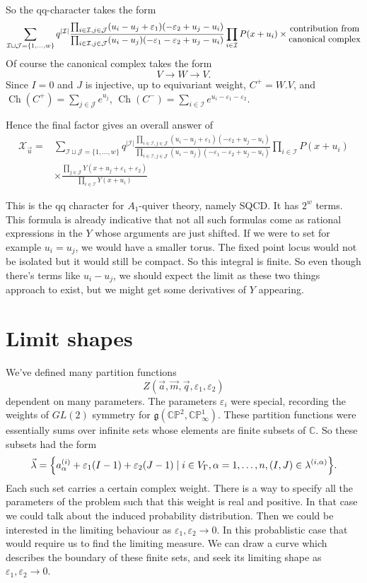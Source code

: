 \documentclass[leqno, openany]{memoir}
\theoremstyle{definition}
\theoremstyle{remark}
\theoremstyle{plain}
\theoremstyle{definition}
\theoremstyle{remark}
\newcommand{\ep}{\varepsilon}
\newcommand{\on}[1]{\operatorname{#1}}
\begin{document}
So the qq-character takes the form 
\[
\sum_{\mathcal{I} \sqcup \mathcal{J} = \{1,\dots,w\}} q^{|\mathcal{I}|} \frac{\prod_{i \in \mathcal{I},j \in \mathcal{J}}(u_i - u_j  + \ep_1)(-\ep_2 + u_j - u_i)}{\prod_{i \in \mathcal{I},j \in \mathcal{J}}(u_i - u_j)(-\ep_1 - \ep_2 + u_j - u_i)} \prod_{i \in \mathcal{I}} P(x + u_i) \times \Centerstack{{contribution from} {canonical complex}}
\]
Of course the canonical complex takes the form 
\[
V \to W \to V.
\]
Since $I = 0$ and $J$ is injective, up to equivariant weight,
$C^+ = W.V$, and $\on{Ch}(C^+) = \sum_{j \in \mathcal{J}} e^{u_j}$, $\on{Ch}(C^-) = \sum_{i \in \mathcal{I}} e^{u_i - \ep_1 - \ep_2}$.

Hence the final factor gives an overall answer of 
\begin{align*}
    \mathcal{X}_{\vec{u}} =&{} \sum_{\mathcal{I} \sqcup \mathcal{J} = \{1,\dots,w\}} q^{|\mathcal{I}|} \frac{\prod_{i \in \mathcal{I},j \in \mathcal{J}}(u_i - u_j  + \ep_1)(-\ep_2 + u_j - u_i)}{\prod_{i \in \mathcal{I},j \in \mathcal{J}}(u_i - u_j)(-\ep_1 - \ep_2 + u_j - u_i)} \prod_{i \in \mathcal{I}} P(x + u_i) \\ &\times \frac{\prod_{j \in \mathcal{J}} Y(x + u_j + \ep_1 + \ep_2)}{\prod_{i \in \mathcal{I}} Y(x + u_i)}
\end{align*}

This is the qq character for $A_1$-quiver theory, namely SQCD. It has $2^w$ terms. This formula is already indicative that not all such formulas come as rational expressions in the $Y$ whose arguments are just shifted.
If we were to set for example $u_i = u_j$, we would have a smaller torus. The fixed point locus would not be isolated but it would still be compact. So this integral is finite. So even though there's terms like $u_i - u_j$, we should expect the limit as these two things approach to exist, but we might get some derivatives of $Y$ appearing.


\section{Limit shapes}

We've defined many partition functions 
\[
Z(\vec{a},\vec{m}, \vec{q}, \ep_1,\ep_2)
\]
dependent on many parameters. The parameters $\ep_i$ were special,
recording the weights of $GL(2)$ symmetry for $\mathfrak{g}(\mathbb{CP}^2,\mathbb{CP}^1_\infty)$.
These partition functions were essentially sums over infinite sets whose elements 
are finite subsets of $\mathbb{C}$. So these subsets had the form 
\[
\vec{\lambda} = \qty{a^{(i)}_\alpha + \ep_1(I - 1) + \ep_2(J-1) \mid i \in V_\Gamma, \alpha = 1,\dots,n, (I,J) \in \lambda^{(i,\alpha)}}.
\]
Each such set carries a certain complex weight. There is a way to specify 
all the parameters of the problem such that this weight is real and positive. In that case we could talk about the induced probability distribution.
Then we could be interested in the limiting behaviour as $\ep_1,\ep_2 \to 0$. In this probablistic case that would 
require us to find the limiting measure. 
We can draw a curve which describes the boundary of these finite sets, 
and seek its limiting shape as $\ep_1,\ep_2 \to 0$. 
\end{document}
